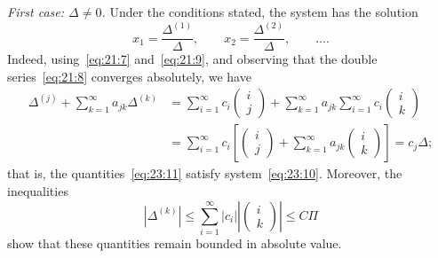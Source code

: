 \documentclass[
  paper=b5,
  fontsize=13pt,
  twoside=true,
  open=any,
  bookmarkpackage=false,
  chapterprefix=true,
  headings=normal
]{scrbook}
\theoremstyle{definition}
\begin{document}
\emph{First case: $\Delta\ne0$.} Under the conditions stated,
the system has the solution
\begin{equation}
  x_1=\frac{\Delta^{(1)}}{\Delta},\qquad
  x_2=\frac{\Delta^{(2)}}{\Delta},\qquad\ldots.
  \tag{11}\label{eq:23:11}
\end{equation}
Indeed, using~\eqref{eq:21:7} and~\eqref{eq:21:9}, and observing that the double series~\eqref{eq:21:8} converges absolutely, we have
\begin{align*}
 \Delta^{(j)}+\sum_{k=1}^{\infty}a_{jk}\Delta^{(k)}
 &=\sum_{i=1}^{\infty}c_i
   \left(\begin{matrix}i\\j\end{matrix}\right)
 +\sum_{k=1}^{\infty}a_{jk}\sum_{i=1}^{\infty}c_i
   \left(\begin{matrix}i\\k\end{matrix}\right)\\
 &=\sum_{i=1}^{\infty}c_i
 \left[
   \left(\begin{matrix}i\\j\end{matrix}\right)
   +\sum_{k=1}^{\infty}a_{jk}
   \left(\begin{matrix}i\\k\end{matrix}\right)
 \right]
 =c_j\Delta;
\end{align*}
that is, the quantities~\eqref{eq:23:11} satisfy system~\eqref{eq:23:10}. Moreover, the inequalities
\[
 |\Delta^{(k)}|\leq\sum_{i=1}^{\infty}|c_i|
 \left|\left(\begin{matrix}i\\k\end{matrix}\right)\right|
 \leq C\Pi
\]
show that these quantities remain bounded in absolute value.
\end{document}
